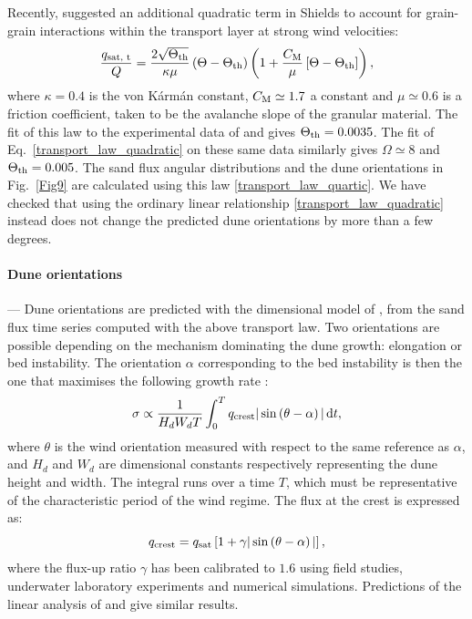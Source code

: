Recently, \citet{Pahtz2020} suggested an additional quadratic term in Shields to account for grain-grain interactions within the transport layer at strong wind velocities:
%
\begin{equation}
\label{transport_law_quartic}
\frac{q_{\textup{sat, t}}}{Q} = \frac{2\sqrt{\Theta_{\textup{th}}}}{\kappa\mu}\left(\Theta - \Theta_{\textup{th}}\right)\left(1 +\frac{C_{\textup{M}}}{\mu}\left[\Theta - \Theta_{\textup{th}}\right]\right),
\end{equation}
%
where $\kappa = 0.4$ is the von K\'arm\'an constant, $C_{\rm M} \simeq 1.7$ a constant and $\mu \simeq 0.6$ is a friction coefficient, taken to be the avalanche slope of the granular material. The fit of this law to the experimental data of \citet{Creyssels2009} and \citet{Ho2011} gives $\Theta_{\textup{th}} = 0.0035$. The fit of Eq.~\ref{transport_law_quadratic} on these same data similarly gives $\Omega \simeq 8$ and $\Theta_{\textup{th}} = 0.005$. The sand flux angular distributions and the dune orientations in Fig.~\ref{Fig9} are calculated using this law \eqref{transport_law_quartic}. We have checked that using the ordinary linear relationship \eqref{transport_law_quadratic} instead does not change the predicted dune orientations by more than a few degrees.

\paragraph{Dune orientations} ---
Dune orientations are predicted with the dimensional model of \citet{Courrech2014}, from the sand flux time series computed with the above transport law. Two orientations are possible depending on the mechanism dominating the dune growth: elongation or bed instability. The orientation $\alpha$ corresponding to the bed instability is then the one that maximises the following growth rate \citep{Rubin1987}:
%
\begin{equation}
\sigma \propto \frac{1}{H_{d} W_{d} T}\int_0^T  q_{\textup{crest}}\vert \sin\left(\theta - \alpha\right) \vert \, \textup{d}t,
\end{equation}
%
where $\theta$ is the wind orientation measured with respect to the same reference as $\alpha$, and $H_{d}$ and $W_{d}$ are dimensional constants respectively representing the dune height and width. The integral runs over a time $T$, which must be representative of the characteristic period of the wind regime. The flux at the crest is expressed as:
%
\begin{equation}
q_{\textup{crest}} = q_{\textup{sat}}\left[1 + \gamma\vert\sin\left(\theta - \alpha\right)\vert\right],
\end{equation}
%
where the flux-up ratio $\gamma$ has been calibrated to $1.6$ using field studies, underwater laboratory experiments and numerical simulations. Predictions of the linear analysis of \citet{Gadal2019} and \citet{Delorme2020} give similar results.

